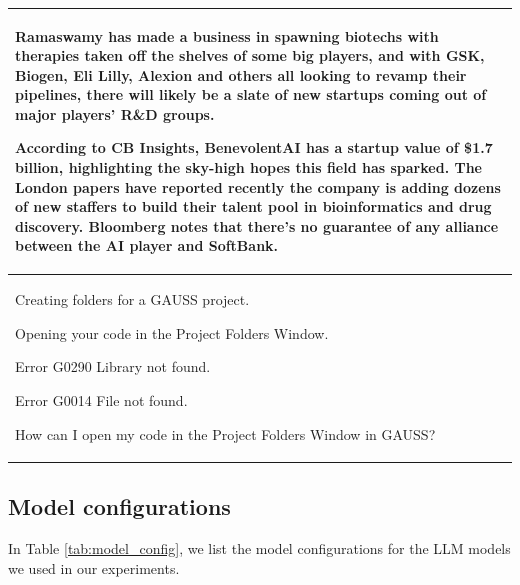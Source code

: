 \documentclass{article}
\theoremstyle{plain}
\theoremstyle{definition}
\theoremstyle{remark}
\begin{document}
\begin{table}[ht]
\begin{center}
\begin{small}
\begin{tabular}{p{1.0\linewidth}}
Ramaswamy has made a business in spawning biotechs with therapies taken off the shelves of some big players, and with GSK, Biogen, Eli Lilly, Alexion and others all looking to revamp their pipelines, there will likely be a slate of new startups coming out of major players’ R\&D groups.

According to CB Insights, BenevolentAI has a startup value of \$1.7 billion, highlighting the sky-high hopes this field has sparked. The London papers have reported recently the company is adding dozens of new staffers to build their talent pool in bioinformatics and drug discovery. Bloomberg notes that there’s no guarantee of any alliance between the AI player and SoftBank. \\
\midrule
Creating folders for a GAUSS project.

Opening your code in the Project Folders Window.

Error G0290 Library not found.

Error G0014 File not found.

How can I open my code in the Project Folders Window in GAUSS? \\
\bottomrule
\end{tabular}
\end{small}
\end{center}
\vskip -0.1in
\end{table}

\subsection{Model configurations}
In Table \ref{tab:model_config}, we list the model configurations for the LLM models we used in our experiments.
\end{document}
